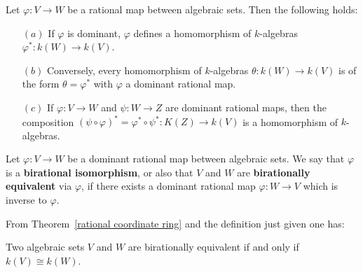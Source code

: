 \begin{theorem}\label{rational coordinate ring}
Let $\varphi:V\to W$ be a rational map between algebraic sets. Then
the following holds:
\begin{itemize}
\item[$(a)$] If $\varphi$ is dominant, $\varphi$ defines a homomorphism of $k$-algebras $\varphi^*:k(W)\to k(V)$.
\item[$(b)$] Conversely, every homomorphism of $k$-algebras $\theta:k(W)\to k(V)$ is of the form $\theta=\varphi^*$ with $\varphi$ a dominant rational map.
\item[$(c)$] If $\varphi:V\to W$ and $\psi:W\to Z$ are dominant rational maps, then the composition $(\psi\circ\varphi)^*=\varphi^*\circ\psi^*:K(Z)\to k(V)$ is a homomorphism of $k$-algebras.
\end{itemize}
\end{theorem}
Let $\varphi:V\to W$ be a dominant rational map between algebraic sets. We say that $\varphi$ is a \textbf{birational isomorphism}, or also that $V$ and $W$ are \textbf{birationally equivalent} via $\varphi$, if there exists a dominant rational map $\varphi:W\to V$ which is inverse to $\varphi$.\par
From Theorem~\ref{rational coordinate ring} and the definition just given one has:
\begin{proposition}\label{birational equiv}
Two algebraic sets $V$ and $W$ are birationally equivalent if and only if $k(V)\cong k(W)$.
\end{proposition}
